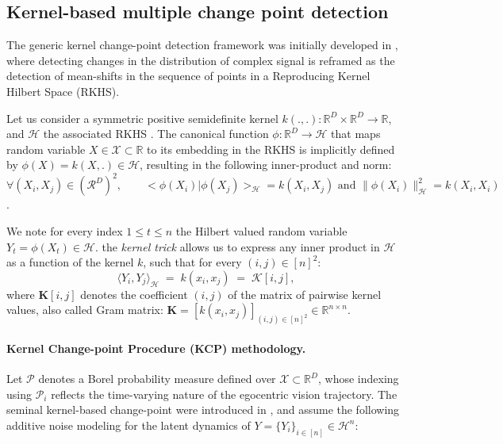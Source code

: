     \subsection{Kernel-based multiple change point detection}
    


        The generic kernel change-point detection framework was initially developed in \cite{4301363}, where detecting changes in the distribution of complex signal is reframed as the detection of mean-shifts in the sequence of points in a Reproducing Kernel Hilbert Space (RKHS). 

        Let us consider a symmetric positive semidefinite kernel $k(., .): \mathbb{R}^D \times \mathbb{R}^D \rightarrow \mathbb{R}$, and $\mathcal{H}$ the associated RKHS \cite{Aronszajn1950TheoryOR}. The canonical function $\phi: \mathbb{R}^D \rightarrow \mathcal{H}$ that maps random variable $X \in \mathcal{X} \subset \mathbb{R}$ to its embedding in the RKHS is implicitly defined by $\phi(X) = k(X, .) \in \mathcal{H}$, resulting in the following inner-product and norm: 
        $$ \forall (X_i, X_j) \in (\mathcal{R}^D)^2, \qquad <\phi(X_i) | \phi(X_j)>_{\mathcal{H}} = k(X_i, X_j) \text{  and   } \|\phi(X_i)\|^2_{\mathcal{H}} = k(X_i, X_i)$$. 

        We note for every index $1 \leq t \leq n$ the Hilbert valued random variable $Y_t = \phi(X_t)\in \mathcal{H}$. the \textit{kernel trick} allows us to express any inner product in $\mathcal{H}$ as a function of the kernel $k$, such that for every $(i, j) \in [n]^2$:
        $$\langle Y_i, Y_j \rangle_{\mathcal{H}} \;=\; k(x_i, x_j) \;=\; \mathbf{\mathcal{K}}[i,j],$$
        where $\mathbf{K}[i, j]$ denotes the coefficient $(i, j)$ of the matrix of pairwise kernel values, also called Gram matrix:  $\mathbf{K} =[k(x_i, x_j)]_{(i, j) \in [n]^2} \in \mathbb{R}^{n \times n}$.


        \paragraph{Kernel Change-point Procedure (KCP) methodology.\\}

        Let $\mathcal{P}$ denotes a Borel probability measure defined over $\mathcal{X} \subset \mathbb{R}^D$, whose indexing using $\mathcal{P}_i$ reflects the time-varying nature of the egocentric vision trajectory. The seminal kernel-based change-point were introduced in \cite{cpt}, and assume the following additive noise modeling for the latent dynamics of $Y = \{Y_i\}_{i \in [n]} \in \mathcal{H}^n$:

